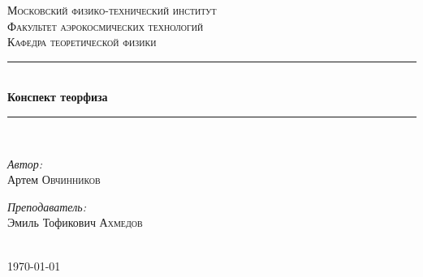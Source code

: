 \documentclass[1 pt]{article}
\begin{document}
\begin{titlepage}
\newcommand{\HRule}{\rule{\linewidth}{0.3 mm}} %

\center %
 

\textsc{\Large Московский физико-технический институт }\\[1.5cm] %
\textsc{\Large Факультет аэрокосмических технологий}\\[0.5cm] %
\textsc{\large Кафедра теоретической физики}\\[0.5cm] %


\HRule \\[0.4cm]
{ \huge \bfseries Конспект теорфиза }\\[0.4cm] %
\HRule \\[1.5cm]
 

\begin{minipage}{0.4\textwidth}
\begin{flushleft} \large
\emph{Автор:}\\ Артем \textsc{Овчинников} %
\end{flushleft}
\end{minipage}
\begin{minipage}{0.4\textwidth}
\begin{flushright} \large
\emph{Преподаватель:} \\
Эмиль Тофикович \textsc{Ахмедов} %
\end{flushright}
\end{minipage}\\[4cm]

{\large \today}\\[2cm] %


 

\vfill %

\end{titlepage}
\tableofcontents
\newpage
\end{document}
